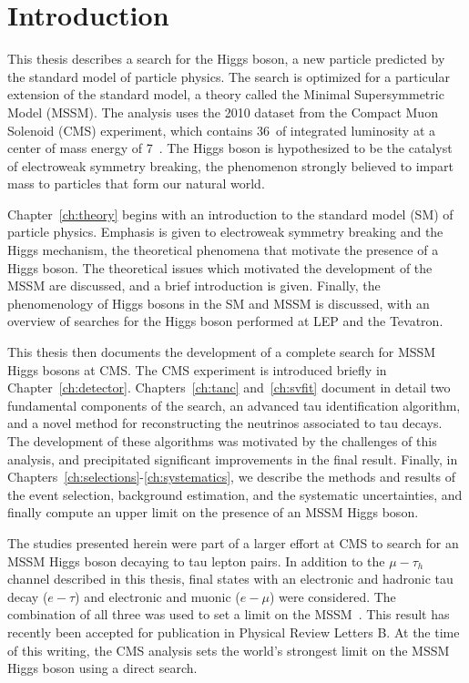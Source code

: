 \ifx\master\undefined\fi
\chapter*{Introduction} 

This thesis describes a search for the Higgs boson, a new particle predicted by
the standard model of particle physics.  The search is optimized for a
particular extension of the standard model, a theory called the Minimal
Supersymmetric Model (MSSM).  The analysis uses the 2010 dataset from the
Compact Muon Solenoid (CMS) experiment, which contains 36~\pbinv of integrated
luminosity at a center of mass energy of 7~\TeV.  The Higgs boson is
hypothesized to be the catalyst of electroweak symmetry breaking, the phenomenon
strongly believed to impart mass to particles that form our natural world.

Chapter~\ref{ch:theory} begins with an introduction to the standard model (SM) of
particle physics. Emphasis is given to electroweak symmetry
breaking and the Higgs mechanism, the theoretical phenomena that motivate the
presence of a Higgs boson.  The theoretical issues which motivated the
development of the MSSM are discussed, and a brief introduction is given.
Finally, the phenomenology of Higgs bosons in the SM and MSSM is discussed, with
an overview of searches for the Higgs boson performed at LEP and the Tevatron.

This thesis then documents the development of a complete search for MSSM Higgs
bosons at CMS\@.  The CMS experiment is introduced briefly in
Chapter~\ref{ch:detector}. Chapters~\ref{ch:tanc} and~\ref{ch:svfit} document in
detail two fundamental components of the search, an advanced tau identification
algorithm, and a novel method for reconstructing the neutrinos associated to tau
decays.  The development of these algorithms was motivated by the challenges of
this analysis, and precipitated significant improvements in the final result.
Finally, in \mbox{Chapters~\ref{ch:selections}-\ref{ch:systematics}}, we
describe the methods and results of the event selection, background estimation,
and the systematic uncertainties, and finally compute an upper limit on the
presence of an MSSM Higgs boson.

The studies presented herein were part of a larger effort at CMS to search for
an MSSM Higgs boson decaying to tau lepton pairs.  In addition to the
$\mu-\tau_h$ channel described in this thesis, final states with an electronic
and hadronic tau decay ($e-\tau$) and electronic and muonic ($e-\mu$) were
considered.  The combination of all three was used to set a limit on the
MSSM~\cite{HIG-10-002}.  This result has recently been accepted for publication
in Physical Review Letters B.  At the time of this writing, the CMS analysis
sets the world's strongest limit on the MSSM Higgs boson using a direct search.
%
\ifx\master\undefined\fi
